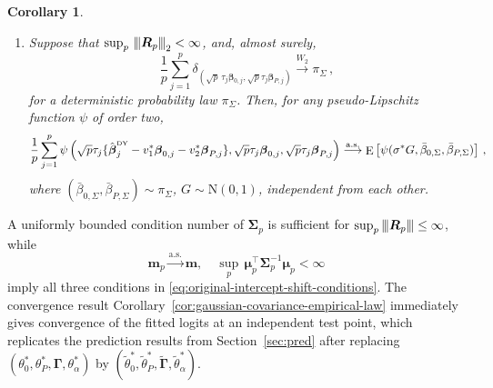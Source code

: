 \documentclass{article}
\DeclareMathOperator{\expect}{E}
\newtheorem{corollary}[theorem]{Corollary}
\theoremstyle{definition}
\newcommand{\mnorms}[1]{{\vert\kern-0.25ex\vert\kern-0.25ex\vert #1
		\vert\kern-0.25ex\vert\kern-0.25ex\vert}}
\newcommand*{\bb}{\boldsymbol}
\newcommand{\betady}{\ensuremath{\hat{\bbeta}^{\textrm{\tiny DY}}}}
\def\bmu{\bb{\mu}}
\def\bSigma{\bb{\Sigma}}
\def\bbeta{\bb{\beta}}
\begin{document}
\begin{bibunit}
\begin{corollary}
\begin{enumerate}[label=(\roman*)]
    \item Suppose that
    $\sup_p \, \mnorms{\bb R_p}_2<\infty$, 
    and, almost surely,
    \begin{equation}
    \label{eq:gaussian-covariance-standardised-signal-law}
        \frac1p\sum_{j=1}^p
        \delta_{(\sqrt p\,\tau_j\bbeta_{0,j},
        \sqrt p \tau_j\bbeta_{P,j})}
        \overset{W_2}{\longrightarrow}\pi_\Sigma\,,
    \end{equation}
    for a deterministic probability law
    $\pi_\Sigma$. Then, for any pseudo-Lipschitz function $\psi$
    of order two,
    \begin{equation}
    \label{eq:gaussian-covariance-test-function-law}
    \begin{aligned}
        \frac1p\sum_{j=1}^p
        \psi\left(
            \sqrt p\tau_j
            \{\betady_j-v_1^*\bbeta_{0,j}-v_2^*\bbeta_{P,j}\},
            \sqrt p\tau_j\bbeta_{0,j},
            \sqrt p\tau_j\bbeta_{P,j}
        \right)
       \overset{\mathrm{a.s.}}{\longrightarrow}
        \expect\left[
            \psi(\sigma^*G,\bar\beta_{0,\Sigma},\bar\beta_{P,\Sigma})
        \right]\,,
    \end{aligned}
    \end{equation}
    where
    $
        (\bar\beta_{0,\Sigma},\bar\beta_{P,\Sigma})\sim\pi_\Sigma$, 
        $G\sim\mathrm N(0,1)
    $,
    independent from each other.
\end{enumerate}
\end{corollary}
\noindent
A uniformly bounded condition number of $\bSigma_p$ is sufficient for
$\sup_p \mnorms{\bb R_p} \leq \infty$, while 
$$
    \bb m_p
    \overset{\mathrm{a.s.}}{\longrightarrow}
    \bb m,
    \quad
    \sup_p \, 
    \bmu_p^\top\bSigma_p^{-1}\bmu_p
    <
    \infty
$$
imply all three conditions in
\eqref{eq:original-intercept-shift-conditions}.
The convergence result Corollary~\ref{cor:gaussian-covariance-empirical-law}
immediately gives convergence of the fitted logits at an independent test point, which replicates the 
prediction results from Section~\ref{sec:pred}
after
replacing
$
    (\theta_0^*,\theta_P^*,\bb\Gamma,\theta_\alpha^*)
$
by
$
    (
        \widetilde\theta_0^*,
        \widetilde\theta_P^*,
        \widetilde{\bb\Gamma},
        \widetilde\theta_\alpha^*
    )
$. 

\end{bibunit}
\end{document}
